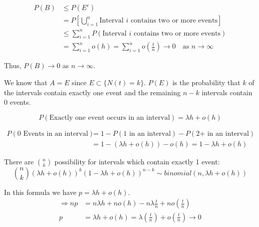 \documentclass{article}
\begin{document}
\begin{equation*}
\begin{split}
    P(B) &\leq P(E^c)\\
    &= P \left[\bigcup\limits_{i=1}^n \text{Interval } i \text{ contains two or more events} \right]\\
    &\leq \sum\limits_{i=1}^n P\left(\text{Interval } i \text{ contains two or more events}\right)\\
    &= \sum\limits_{i=1}^n o(h) = \sum\limits_{i=1}^n o\left(\frac{t}{n}\right) \to 0 \quad \text{as } n \to \infty
\end{split}
\end{equation*}

Thus, $P(B) \to 0$ as $n \to \infty$.

We know that $A = E$ since $E \subset \{N(t) = k\}$. $P(E)$ is the probability that $k$ of the intervals contain exactly one event and the remaining $n-k$ intervals contain 0 events.

\begin{equation*}
    P(\text{Exactly one event occurs in an interval}) = \lambda h + o (h)
\end{equation*}

\begin{equation*}
\begin{split}
P(\text{0 Events in an interval}) &= 1 - P(\text{1 in an interval}) - P(\text{2+ in an interval})\\
&= 1 - (\lambda h + o(h)) - o(h) = 1- \lambda h + o(h)
\end{split}
\end{equation*}

There are ${n \choose k}$ possibility for intervals which contain exactly 1 event:
\begin{equation*}
    {n \choose k} (\lambda h + o(h))^k (1-\lambda h + o(h))^{n-k} \sim binomial(n,\lambda h + o(h))
\end{equation*}

In this formula we have $p = \lambda h + o(h)$.
\begin{equation*}
\begin{split}
    \Rightarrow np &= n\lambda h + n o(h) - n \lambda \frac{t}{n} + n o\left(\frac{t}{n}\right)\\
    p &= \lambda h + o(h) = \lambda \left(\frac{t}{n}\right) + o\left(\frac{t}{n} \right) \rightarrow 0
\end{split}
\end{equation*}
\end{document}
